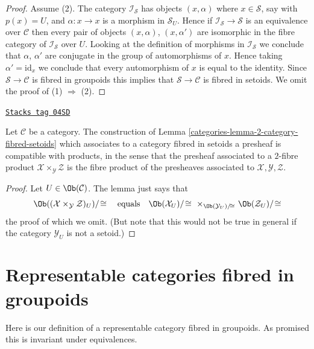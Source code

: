 \begin{proof}
Assume (2). The category $\mathcal{I}_\mathcal{S}$ has objects
$(x, \alpha)$ where $x \in \mathcal{S}$, say with $p(x) = U$, and
$\alpha : x \to x$ is a morphism in $\mathcal{S}_U$. Hence if
$\mathcal{I}_\mathcal{S} \to \mathcal{S}$ is an equivalence over $\mathcal{C}$
then every pair of objects $(x, \alpha)$, $(x, \alpha')$ are isomorphic
in the fibre category of $\mathcal{I}_\mathcal{S}$ over $U$.
Looking at the definition of morphisms in $\mathcal{I}_\mathcal{S}$
we conclude that $\alpha$, $\alpha'$ are conjugate in the group
of automorphisms of $x$. Hence taking $\alpha' = \text{id}_x$ we conclude
that every automorphism of $x$ is equal to the identity.
Since $\mathcal{S} \to \mathcal{C}$ is fibred in groupoids this
implies that $\mathcal{S} \to \mathcal{C}$ is fibred in setoids.
We omit the proof of (1) $\Rightarrow$ (2).
\end{proof}

\begin{lemma}
\label{categories-lemma-category-fibred-setoids-presheaves-products}
\href{https://stacks.math.columbia.edu/tag/04SD}{\texttt{Stacks tag 04SD}}

Let $\mathcal{C}$ be a category.
The construction of
Lemma \ref{categories-lemma-2-category-fibred-setoids}
which associates to a category fibred in setoids a presheaf is
compatible with products, in the sense that the presheaf associated
to a $2$-fibre product $\mathcal{X} \times_\mathcal{Y} \mathcal{Z}$
is the fibre product of the presheaves associated to
$\mathcal{X}, \mathcal{Y}, \mathcal{Z}$.
\end{lemma}

\begin{proof}
Let $U \in \Ob(\mathcal{C})$. The lemma just says that
$$
\Ob((\mathcal{X} \times_\mathcal{Y} \mathcal{Z})_U)/\!\cong
\quad \text{equals} \quad
\Ob(\mathcal{X}_U)/\!\cong
\ \times_{\Ob(\mathcal{Y}_U)/\!\cong}
\ \Ob(\mathcal{Z}_U)/\!\cong
$$
the proof of which we omit. (But note that this would not be true
in general if the category $\mathcal{Y}_U$ is not a setoid.)
\end{proof}

\section{Representable categories fibred in groupoids}
\label{categories-section-representable-fibred-groupoids}
Here is our definition of a representable category fibred in groupoids.
As promised this is invariant under equivalences.

